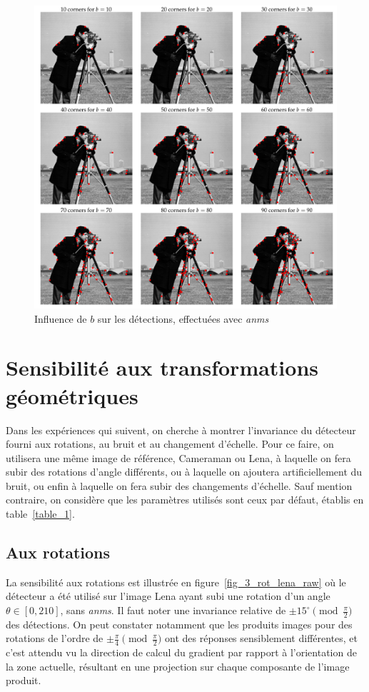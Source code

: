 \documentclass[12pt,a4paper,onecolumn]{article}
\begin{document}
\begin{figure}[H]
	\centering
	\includegraphics[width = 1.0\textwidth]{2_cameraman_b}
	\caption{Influence de \(b\) sur les détections, effectuées avec \textit{anms}}
	\label{fig_2_b}
\end{figure}


\section{Sensibilité aux transformations géométriques}

Dans les expériences qui suivent, on cherche à montrer l'invariance du détecteur fourni aux rotations, au bruit et au changement d'échelle. Pour ce faire, on utilisera une même image de référence, Cameraman ou Lena, à laquelle on fera subir des rotations d'angle différents, ou à laquelle on ajoutera artificiellement du bruit, ou enfin à laquelle on fera subir des changements d'échelle. Sauf mention contraire, on considère que les paramètres utilisés sont ceux par défaut, établis en table~\ref{table_1}.


\subsection{Aux rotations}

La sensibilité aux rotations est illustrée en figure~\ref{fig_3_rot_lena_raw} où le détecteur a été utilisé sur l'image Lena ayant subi une rotation d'un angle \(\theta \in [0, 210]\), sans \textit{anms}. Il faut noter une invariance relative de \( \pm 15^{\circ}\pmod{\frac{\pi}{2}}\) des détections. On peut constater notamment que les produits images pour des rotations de l'ordre de \( \pm \frac{\pi}{4}\pmod{\frac{\pi}{2}}\) ont des réponses sensiblement différentes, et c'est attendu vu la direction de calcul du gradient par rapport à l'orientation de la zone actuelle, résultant en une projection sur chaque composante de l'image produit.
\end{document}
